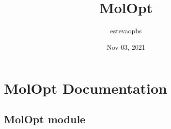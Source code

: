 \documentclass[letterpaper,10pt,english]{sphinxmanual}
\title{MolOpt}
\date{Nov 03, 2021}
\author{estevaopbs}
\begin{document}
\pagestyle{empty}
\sphinxmaketitle
\pagestyle{plain}
\sphinxtableofcontents
\pagestyle{normal}
\label{\detokenize{index::doc}}



\chapter{MolOpt Documentation}
\label{\detokenize{modules:molopt-documentation}}\label{\detokenize{modules::doc}}

\section{MolOpt module}
\label{\detokenize{MolOpt:module-MolOpt}}\label{\detokenize{MolOpt:molopt-module}}\label{\detokenize{MolOpt::doc}}
\end{document}
